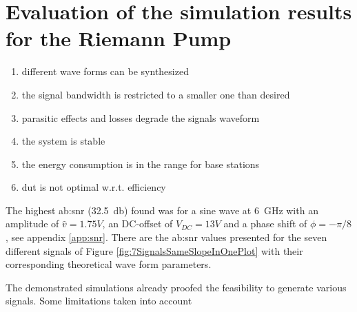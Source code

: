 
 


\section{Evaluation of the simulation results for the Riemann Pump}

\begin{enumerate}
	\item different wave forms can be synthesized
	\item the signal bandwidth is restricted to a smaller one than desired
	\item parasitic effects and losses degrade the signals waveform
	\item the system is stable
	\item the energy consumption is in the range for base stations
	\item dut is not optimal w.r.t. efficiency
\end{enumerate}

The highest \gls{ab:snr} (\SI{32.5}{\decibel}) found was for a sine wave at \SI{6}{\giga \hertz} with an amplitude of $\hat{v} = 1.75 V$, an DC-offset of $V_{DC} = 13 V$ and a phase shift of $\phi = -\pi/8$, see appendix \ref{app:snr}.
There are the \gls{ab:snr} values presented for the seven different signals of Figure \ref{fig:7SignalsSameSlopeInOnePlot} with their corresponding theoretical wave form parameters.

The demonstrated simulations already proofed the feasibility to generate various signals.
Some limitations taken into account 




